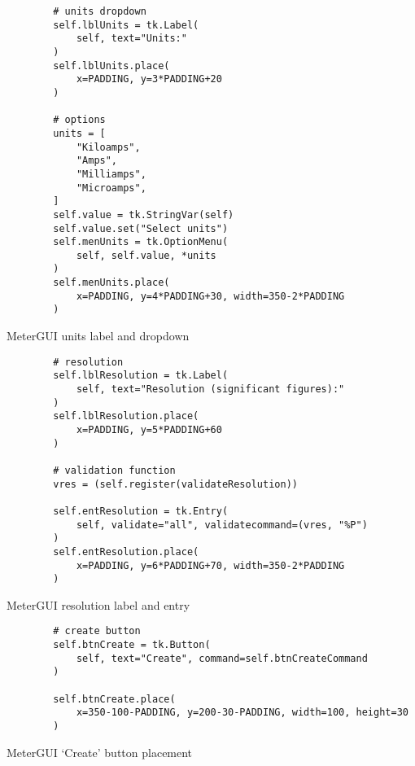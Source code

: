 \newpage
\begin{listing}[!ht]
    \begin{verbatim}
        # units dropdown
        self.lblUnits = tk.Label(
            self, text="Units:"
        )
        self.lblUnits.place(
            x=PADDING, y=3*PADDING+20
        )
        
        # options
        units = [
            "Kiloamps",
            "Amps",
            "Milliamps",
            "Microamps",
        ]
        self.value = tk.StringVar(self)
        self.value.set("Select units")
        self.menUnits = tk.OptionMenu(
            self, self.value, *units
        )
        self.menUnits.place(
            x=PADDING, y=4*PADDING+30, width=350-2*PADDING
        )
    \end{verbatim}
    \caption{MeterGUI units label and dropdown}
    \label{sc:metergui-units-lbl-menu}
\end{listing}

\newpage
\begin{listing}[!ht]
    \begin{verbatim}
        # resolution
        self.lblResolution = tk.Label(
            self, text="Resolution (significant figures):"
        )
        self.lblResolution.place(
            x=PADDING, y=5*PADDING+60
        )
        
        # validation function
        vres = (self.register(validateResolution))
        
        self.entResolution = tk.Entry(
            self, validate="all", validatecommand=(vres, "%P")
        )
        self.entResolution.place(
            x=PADDING, y=6*PADDING+70, width=350-2*PADDING
        )

    \end{verbatim}
    \caption{MeterGUI resolution label and entry}
    \label{sc:metergui-res-lbl-ent}
\end{listing}


\newpage
\begin{listing}[!ht]
    \begin{verbatim}
        # create button
        self.btnCreate = tk.Button(
            self, text="Create", command=self.btnCreateCommand
        )
        
        self.btnCreate.place(
            x=350-100-PADDING, y=200-30-PADDING, width=100, height=30
        )
    \end{verbatim}
    \caption{MeterGUI `Create' button placement}
    \label{sc:metergui-create-btn}
\end{listing}


